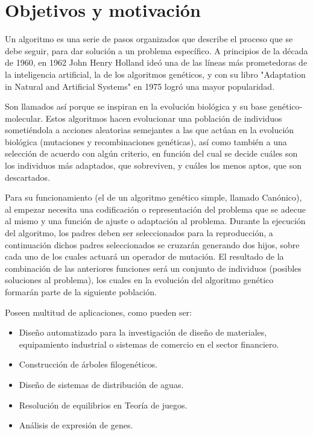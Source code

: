 \chapter{Objetivos y motivación}


\bigskip
Un algoritmo es una serie de pasos organizados que describe el proceso que se debe seguir, para dar solución a un problema específico. A principios de la década de 1960, en 1962 John Henry Holland ideó una de las líneas más prometedoras de la inteligencia artificial, la de los algoritmos genéticos, y con su libro "Adaptation in Natural and Artificial Systems" en 1975 logró una mayor popularidad. 

Son llamados así porque se inspiran en la evolución biológica y su base genético-molecular. Estos algoritmos hacen evolucionar una población de individuos sometiéndola a acciones aleatorias semejantes a las que actúan en la evolución biológica (mutaciones y recombinaciones genéticas), así como también a una selección de acuerdo con algún criterio, en función del cual se decide cuáles son los individuos más adaptados, que sobreviven, y cuáles los menos aptos, que son descartados.

\bigskip
Para su funcionamiento (el de un algoritmo genético simple, llamado Canónico), al empezar necesita una codificación o representación del problema que se adecue al mismo y una función de ajuste o adaptación al problema. Durante la ejecución del algoritmo, los padres deben ser seleccionados para la reproducción, a continuación dichos padres seleccionados se cruzarán generando dos hijos, sobre cada uno de los cuales actuará un operador de mutación. El resultado de la combinación de las anteriores funciones será un conjunto de individuos (posibles soluciones al problema), los cuales en la evolución del algoritmo genético formarán parte de la siguiente población.

\bigskip
Poseen multitud de aplicaciones, como pueden ser:

\begin{itemize}
	\item Diseño automatizado para la investigación de diseño de materiales, equipamiento industrial o sistemas de comercio en el sector financiero.
	\item Construcción de árboles filogenéticos.
	\item Diseño de sistemas de distribución de aguas.
	\item Resolución de equilibrios en Teoría de juegos.
	\item Análisis de expresión de genes.
\end{itemize}

